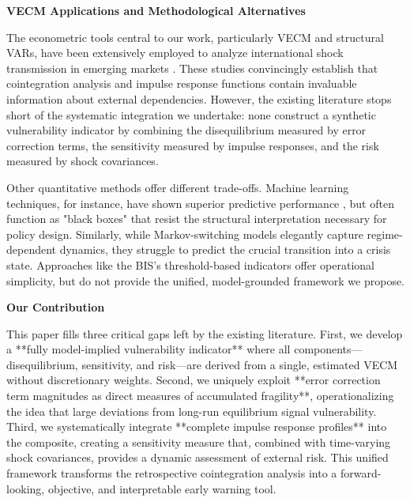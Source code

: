 \documentclass[12pt,a4paper]{article}
\numberwithin{equation}{section}
\theoremstyle{definition}
\theoremstyle{remark}
\begin{document}
\textbf{VECM Applications and Methodological Alternatives}

The econometric tools central to our work, particularly VECM and structural VARs, have been extensively employed to analyze international shock transmission in emerging markets \parencite{canova2005transmission, mackowiak2007external, ahmed2015vulnerable, kenourgios2011financial}. These studies convincingly establish that cointegration analysis and impulse response functions contain invaluable information about external dependencies. However, the existing literature stops short of the systematic integration we undertake: none construct a synthetic vulnerability indicator by combining the disequilibrium measured by error correction terms, the sensitivity measured by impulse responses, and the risk measured by shock covariances.

Other quantitative methods offer different trade-offs. Machine learning techniques, for instance, have shown superior predictive performance \parencite{buckmann2023credit, lang2020machine}, but often function as "black boxes" that resist the structural interpretation necessary for policy design. Similarly, while Markov-switching models \parencite{hamilton1989new, jeanne2000currency, abiad2003early} elegantly capture regime-dependent dynamics, they struggle to predict the crucial transition into a crisis state. Approaches like the BIS's threshold-based indicators \parencite{drehmann2014evaluating} offer operational simplicity, but do not provide the unified, model-grounded framework we propose.

\textbf{Our Contribution}

This paper fills three critical gaps left by the existing literature. First, we develop a **fully model-implied vulnerability indicator** where all components—disequilibrium, sensitivity, and risk—are derived from a single, estimated VECM without discretionary weights. Second, we uniquely exploit **error correction term magnitudes as direct measures of accumulated fragility**, operationalizing the idea that large deviations from long-run equilibrium signal vulnerability. Third, we systematically integrate **complete impulse response profiles** into the composite, creating a sensitivity measure that, combined with time-varying shock covariances, provides a dynamic assessment of external risk. This unified framework transforms the retrospective cointegration analysis into a forward-looking, objective, and interpretable early warning tool.

\end{document}
